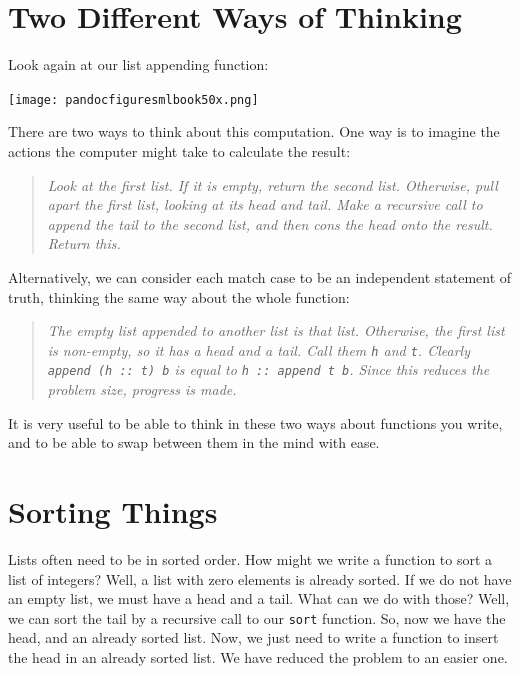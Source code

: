 \documentclass[]{book}
\begin{document}
\cleardoublepage
\thispagestyle{empty}

\pagestyle{empty}

\chapter*{Two Different Ways of Thinking}

Look again at our list appending function:

\medskip
\begin{center}
\noindent\texttt{[image: pandocfiguresmlbook50x.png]}
\end{center}
\medskip

\noindent There are two ways to think about this computation. One way is to imagine the actions the computer might take to calculate the result:

\begin{quote}
\textit{Look at the first list. If it is empty, return the second list. Otherwise, pull apart the first list, looking at its head and tail. Make a recursive call to append the tail to the second list, and then cons the head onto the result. Return this.}
\end{quote}

\noindent Alternatively, we can consider each match case to be an independent statement of truth, thinking the same way about the whole function:

\begin{quote}
\textit{The empty list appended to another list is that list. Otherwise, the first list is non-empty, so it has a head and a tail. Call them \texttt{h} and \texttt{t}. Clearly \texttt{append (h ::\ t) b} is equal to \texttt{h ::\ append t b}. Since this reduces the problem size, progress is made.}
\end{quote}

\noindent It is very useful to be able to think in these two ways about functions you write, and to be able to swap between them in the mind with ease.

\chapter{Sorting Things}
\pagestyle{fancy}
Lists often need to be in sorted order. How might we write a function to sort a list of integers? Well, a list with zero elements is already sorted. If we do not have an empty list, we must have a head and a tail. What can we do with those? Well, we can sort the tail by a recursive call to our \texttt{sort} function. So, now we have the head, and an already sorted list. Now, we just need to write a function to insert the head in an already sorted list. We have reduced the problem to an easier one. 
\end{document}
